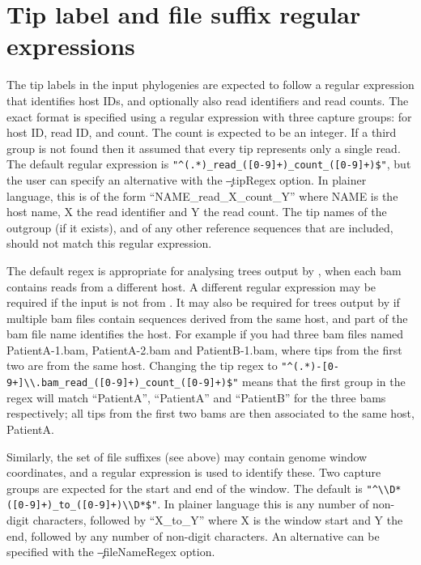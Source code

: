 \section{Tip label and file suffix regular expressions} \label{sec:regexes}

The tip labels in the input phylogenies are expected to follow a regular expression that identifies host IDs, and optionally also read identifiers and read counts.
The exact format is specified using a regular expression with three capture groups: for host ID, read ID, and count.
The count is expected to be an integer.
If a third group is not found then it assumed that every tip represents only a single read.
The default regular expression is \verb|"^(.*)_read_([0-9]+)_count_([0-9]+)$"|, but the user can specify an alternative with the \c{--tipRegex} option.
In plainer language, this is of the form ``NAME\_read\_X\_count\_Y'' where NAME is the host name, X the read identifier and Y the read count.
The tip names of the outgroup (if it exists), and of any other reference sequences that are included, should not match this regular expression.

The default regex is appropriate for analysing trees output by \pmt, when each bam contains reads from a different host.
A different regular expression may be required if the input is not from \pmt.
It may also be required for trees output by \pmt if multiple bam files contain sequences derived from the same host, and part of the bam file name identifies the host.
For example if you had three bam files named \mbox{PatientA-1.bam}, PatientA-2.bam and PatientB-1.bam, where tips from the first two are from the same host.
Changing the tip regex to \verb|"^(.*)-[0-9+]\\.bam_read_([0-9]+)_count_([0-9]+)$"| means that the first group in the regex will match ``PatientA'', ``PatientA'' and ``PatientB'' for the three bams respectively; all tips from the first two bams are then associated to the same host, PatientA.

Similarly, the set of file suffixes (see above) may contain genome window coordinates, and a regular expression is used to identify these.
Two capture groups are expected for the start and end of the window.
The default is \verb|"^\\D*([0-9]+)_to_([0-9]+)\\D*$"|.
In plainer language this is any number of non-digit characters, followed by ``X\_to\_Y'' where X is the window start and Y the end, followed by any number of non-digit characters.
An alternative can be specified with the \c{--fileNameRegex} option.

